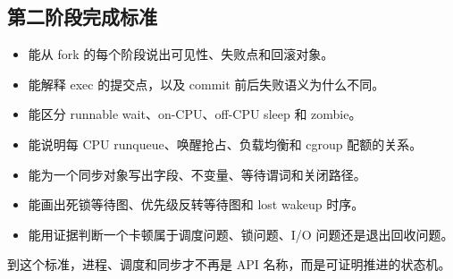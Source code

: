 \subsection{第二阶段完成标准}

\begin{itemize}
\tightlist
\item 能从 fork 的每个阶段说出可见性、失败点和回滚对象。
\item 能解释 exec 的提交点，以及 commit 前后失败语义为什么不同。
\item 能区分 runnable wait、on-CPU、off-CPU sleep 和 zombie。
\item 能说明每 CPU runqueue、唤醒抢占、负载均衡和 cgroup 配额的关系。
\item 能为一个同步对象写出字段、不变量、等待谓词和关闭路径。
\item 能画出死锁等待图、优先级反转等待图和 lost wakeup 时序。
\item 能用证据判断一个卡顿属于调度问题、锁问题、I/O 问题还是退出回收问题。
\end{itemize}

到这个标准，进程、调度和同步才不再是 API 名称，而是可证明推进的状态机。
